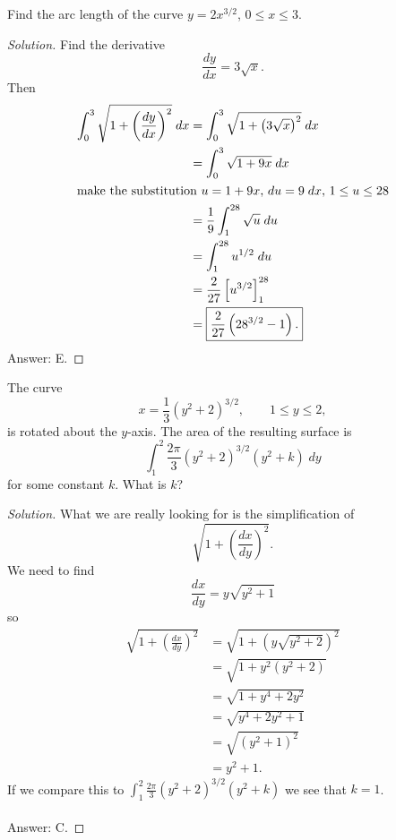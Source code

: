 \begin{problem}
Find the arc length of the curve $y=2x^{3/2}$, $0\leq x\leq 3$.
\end{problem}
\begin{proof}[Solution]
Find the derivative
\[
\frac{dy}{dx}=3\sqrt{x}.
\]
Then
\begin{align*}
\int_0^3\sqrt{1+\left(\frac{dy}{dx}\right)^2}\;dx
&=\int_0^3\sqrt{1+\left(3\sqrt{x}\right)^2}\;dx\\
&=\int_0^3\sqrt{1+9x}\;dx\\
\intertext{make the substitution $u=1+9x$, $du=9\;dx$, $1\leq u\leq 28$}
&=\frac{1}{9}\int_1^{28}\sqrt{u}\;du\\
&=\int_1^{28}u^{1/2}\;du\\
&=\frac{2}{27}\left[u^{3/2}\right]_1^{28}\\
&=\boxed{\frac{2}{27}\left(28^{3/2}-1\right).}
\end{align*}
Answer: {\color{Red} E.}
\end{proof}

\begin{problem}
The curve
\[
x=\frac{1}{3}\left(y^2+2\right)^{3/2},\qquad 1\leq y\leq 2,
\]
is rotated about the $y$-axis. The area of the resulting surface is
\[
\int_1^2\frac{2\pi}{3}\left( y^2+2\right)^{3/2}(y^2+k)\;dy
\]
for some constant $k$. What is $k$?
\end{problem}
\begin{proof}[Solution]
What we are really looking for is the simplification of
\[
\sqrt{1+\left(\frac{dx}{dy}\right)^2}.
\]
We need to find
\[
\frac{dx}{dy}=y\sqrt{y^2+1}
\]
so
\begin{align*}
\sqrt{1+\left(\frac{dx}{dy}\right)^2}
&=\sqrt{1+\left(y\sqrt{y^2+2}\right)^2}\\
&=\sqrt{1+y^2\left(y^2+2\right)}\\
&=\sqrt{1+y^4+2y^2}\\
&=\sqrt{y^4+2y^2+1}\\
&=\sqrt{\left(y^2+1\right)^2}\\
&=y^2+1.
\end{align*}
If we compare this to
$\displaystyle\int_1^2\frac{2\pi}{3}\left(y^2+2\right)^{3/2}\left(y^2+k\right)$
we see that $k=1$.
\\\\
Answer: {\color{Red} C.}
\end{proof}

